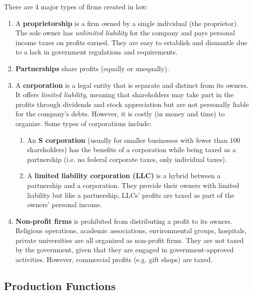 \documentclass{article}
\begin{document}
  \begin{definition}
    \label{def:types-of-firms}
    There are 4 major types of firms created in law: 
    \begin{enumerate}
      \item A \textbf{proprietorship} is a firm owned by a single individual (the proprietor). The sole owner has \textit{unlimited liability} for the company and pays personal income taxes on profits earned. They are easy to establish and dismantle due to a lack in government regulations and requirements. 
      \item \textbf{Partnerships} share profits (equally or unequally). 
      \item A \textbf{corporation} is a legal entity that is separate and distinct from its owners. It offers \textit{limited liability}, meaning that shareholders may take part in the profits through dividends and stock appreciation but are not personally liable for the company's debts. However, it is costly (in money and time) to organize. Some types of corporations include: 
      \begin{enumerate}
        \item An \textbf{S corporation} (usually for smaller businesses with fewer than 100 shareholders) has the benefits of a corporation while being taxed as a partnership (i.e. no federal corporate taxes, only individual taxes). 
        \item A \textbf{limited liability corporation (LLC)} is a hybrid between a partnership and a corporation. They provide their owners with limited liability but like a partnership, LLCs' profits are taxed as part of the owners' personal income. 
      \end{enumerate}
      \item \textbf{Non-profit firms} is prohibited from distributing a profit to its owners. Religious operations, academic associations, environmental groups, hospitals, private universities are all organized as non-profit firms. They are not taxed by the government, given that they are engaged in government-approved activities. However, commercial profits (e.g. gift shops) are taxed. 
    \end{enumerate}
  \end{definition}

  \subsection{Production Functions}
\end{document}
